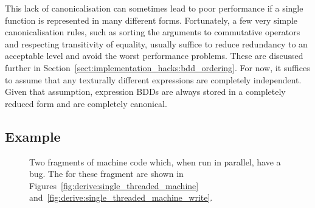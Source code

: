 This lack of canonicalisation can sometimes lead to poor performance
if a single function is represented in many different forms.
Fortunately, a few very simple canonicalisation rules, such as sorting
the arguments to commutative operators and respecting transitivity of
equality, usually suffice to reduce redundancy to an acceptable level
and avoid the worst performance problems.  These are discussed further
in Section~\ref{sect:implementation_hacks:bdd_ordering}.  For now, it
suffices to assume that any texturally different expressions are
completely independent.  Given that assumption, expression BDDs are
always stored in a completely reduced form and are completely
canonical.

\subsection{Example}

\begin{figure}
  \caption{Two fragments of machine code which, when run in parallel,
    have a bug.  The {\StateMachines} for these fragment are shown in
    Figures~\ref{fig:derive:single_threaded_machine}
    and~\ref{fig:derive:single_threaded_machine_write}.}
  \label{fig:derive:single_threaded_machine_inp}
\end{figure}

